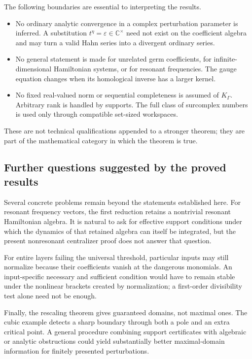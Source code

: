\documentclass[11pt,letterpaper]{article}
\numberwithin{equation}{section}
\theoremstyle{definition}
\theoremstyle{remark}
\newcommand{\C}{\mathbb C}
\begin{document}
The following boundaries are essential to interpreting the results.
\begin{itemize}
\item No ordinary analytic convergence in a complex perturbation parameter
is inferred. A substitution $t^\eta=\varepsilon\in\C^\times$ need not exist
on the coefficient algebra and may turn a valid Hahn series into a
divergent ordinary series.
\item No general statement is made for unrelated germ coefficients, for
infinite-dimensional Hamiltonian systems, or for resonant frequencies.
The gauge equation changes when its homological inverse has a larger
kernel.
\item No fixed real-valued norm or sequential completeness is assumed of
$K_\Gamma$. Arbitrary rank is handled by supports. The full class of
surcomplex numbers is used only through compatible set-sized workspaces.
\end{itemize}
These are not technical qualifications appended to a stronger theorem; they
are part of the mathematical category in which the theorem is true.

\subsection{Further questions suggested by the proved results}
Several concrete problems remain beyond the statements established here.
For resonant frequency vectors, the first reduction retains a nontrivial
resonant Hamiltonian algebra. It is natural to ask for effective support
conditions under which the dynamics of that retained algebra can itself be
integrated, but the present nonresonant centralizer proof does not answer
that question.

For entire layers failing the universal threshold, particular inputs may
still normalize because their coefficients vanish at the dangerous
monomials. An input-specific necessary and sufficient condition would have
to remain stable under the nonlinear brackets created by normalization;
a first-order divisibility test alone need not be enough.

Finally, the rescaling theorem gives guaranteed domains, not maximal ones.
The cubic example detects a sharp boundary through both a pole and an
extra critical point. A general procedure combining support certificates
with algebraic or analytic obstructions could yield substantially better
maximal-domain information for finitely presented perturbations.
\end{document}
